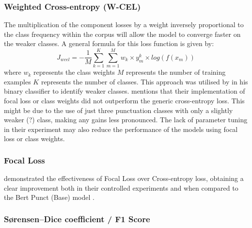 \documentclass[a4paper]{article}
\begin{document}
\begin{multicols}{2}
\subsubsection{Weighted Cross-entropy (W-CEL)}
The multiplication of the component losses by a weight inversely proportional to the class frequency within the corpus will allow the model to converge faster on the weaker classes. A general formula for this loss function is given by: \[
J_{wcel}=-\frac{1}{M}\sum_{k=1}^{K}\sum_{m=1}^{M}w_k \times y_m^k \times log(f(x_m))
\] where $w_k$ represents the class weights \newline
$M$ represents the number of training examples \newline
$K$ represents the number of classes. \newline
This approach was utilised by \cite{adaptivenerunbalanceddata} in his binary classifier to identify weaker classes. \citet{efficientbertrobust} mentions that their implementation of focal loss or class weights did not outperform the generic cross-entropy loss. This might be due to the use of just three punctuation classes with only a slightly weaker (?) class, making any gains less pronounced. The lack of parameter tuning in their experiment may also reduce the performance of the models using focal loss or class weights.

\subsubsection{Focal Loss}
\citet{focallosspunct} demonstrated the effectiveness of Focal Loss over Cross-entropy loss, obtaining a clear improvement both in their controlled experiments and when compared to the Bert Punct (Base) model \citep{pandababa}.

\subsubsection{Sørensen–Dice coefficient / F1 Score}





\end{multicols}
\end{document}
